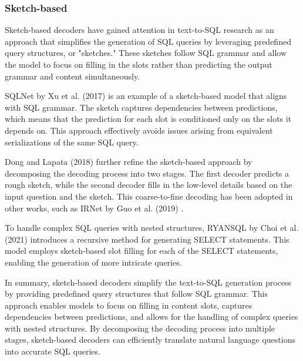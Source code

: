 \subsubsection{Sketch-based}

Sketch-based decoders have gained attention in text-to-SQL research as an approach that simplifies the generation of SQL queries by leveraging predefined query structures, or "sketches." These sketches follow SQL grammar and allow the model to focus on filling in the slots rather than predicting the output grammar and content simultaneously.

SQLNet by Xu et al. (2017) \cite{xu_sqlnet_2017} is an example of a sketch-based model that aligns with SQL grammar. The sketch captures dependencies between predictions, which means that the prediction for each slot is conditioned only on the slots it depends on. This approach effectively avoids issues arising from equivalent serializations of the same SQL query.

Dong and Lapata (2018) \cite{dong-lapata-2018-coarse} further refine the sketch-based approach by decomposing the decoding process into two stages. The first decoder predicts a rough sketch, while the second decoder fills in the low-level details based on the input question and the sketch. This coarse-to-fine decoding has been adopted in other works, such as IRNet by Guo et al. (2019) \cite{DBLP:journals/corr/abs-1905-08205}.

To handle complex SQL queries with nested structures, RYANSQL by Choi et al. (2021) \cite{10.1162/coli_a_00403} introduces a recursive method for generating SELECT statements. This model employs sketch-based slot filling for each of the SELECT statements, enabling the generation of more intricate queries.

In summary, sketch-based decoders simplify the text-to-SQL generation process by providing predefined query structures that follow SQL grammar. This approach enables models to focus on filling in content slots, captures dependencies between predictions, and allows for the handling of complex queries with nested structures. By decomposing the decoding process into multiple stages, sketch-based decoders can efficiently translate natural language questions into accurate SQL queries.